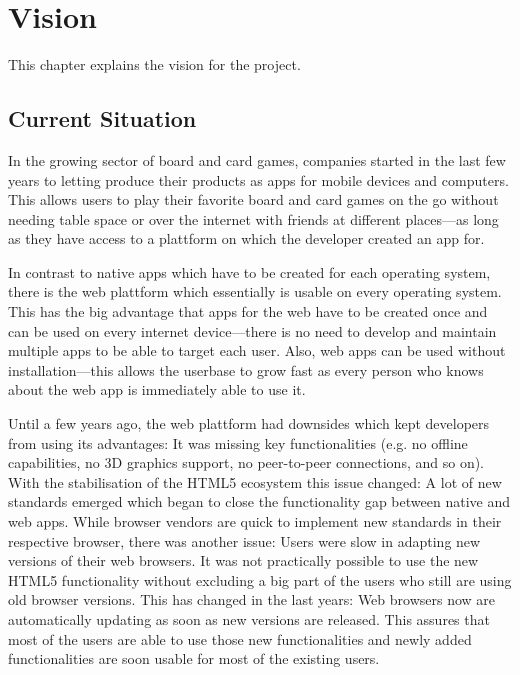 \chapter{Vision}

This chapter explains the vision for the project.

\section{Current Situation}

In the growing sector of board and card games, companies started in the last few
years to letting produce their products as apps for mobile devices and
computers. This allows users to play their favorite board and card games on the
go without needing table space or over the internet with friends at different
places---as long as they have access to a plattform on which the developer
created an app for.

In contrast to native apps which have to be created for each operating system,
there is the web plattform which essentially is usable on every operating
system. This has the big advantage that apps for the web have to be created once
and can be used on every internet device---there is no need to develop and
maintain multiple apps to be able to target each user. Also, web apps can be
used without installation---this allows the userbase to grow fast as every
person who knows about the web app is immediately able to use it.

Until a few years ago, the web plattform had downsides which kept developers
from using its advantages: It was missing key functionalities (e.g.
no offline capabilities, no 3D graphics support, no \gls{peer-to-peer}
connections, and so on). With the stabilisation of the \gls{HTML5} ecosystem
this issue changed: A lot of new standards emerged which began to close the
functionality gap between native and web apps. While browser vendors are quick
to implement new standards in their respective browser, there was another issue:
Users were slow in adapting new versions of their web browsers. It was not
practically possible to use the new \gls{HTML5} functionality without excluding
a big part of the users who still are using old browser versions. This has
changed in the last years: Web browsers now are automatically updating as soon
as new versions are released. This assures that most of the users are able to
use those new functionalities and newly added functionalities are soon usable
for most of the existing users.

